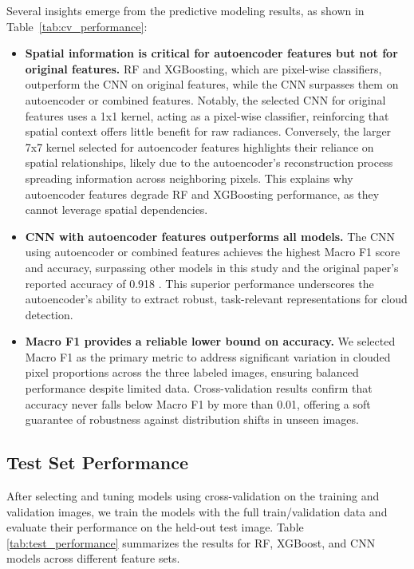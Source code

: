 \documentclass[10pt,letterpaper]{article}
\begin{document}
Several insights emerge from the predictive modeling results, as shown in Table~\ref{tab:cv_performance}:

\begin{itemize}
    \item \textbf{Spatial information is critical for autoencoder features but not for original features.} RF and XGBoosting, which are pixel-wise classifiers, outperform the CNN on original features, while the CNN surpasses them on autoencoder or combined features. Notably, the selected CNN for original features uses a 1x1 kernel, acting as a pixel-wise classifier, reinforcing that spatial context offers little benefit for raw radiances. Conversely, the larger 7x7 kernel selected for autoencoder features highlights their reliance on spatial relationships, likely due to the autoencoder's reconstruction process spreading information across neighboring pixels. This explains why autoencoder features degrade RF and XGBoosting performance, as they cannot leverage spatial dependencies.

    \item \textbf{CNN with autoencoder features outperforms all models.} The CNN using autoencoder or combined features achieves the highest Macro F1 score and accuracy, surpassing other models in this study and the original paper's reported accuracy of 0.918 \cite{shi2008daytime}. This superior performance underscores the autoencoder's ability to extract robust, task-relevant representations for cloud detection.

    \item \textbf{Macro F1 provides a reliable lower bound on accuracy.} We selected Macro F1 as the primary metric to address significant variation in clouded pixel proportions across the three labeled images, ensuring balanced performance despite limited data. Cross-validation results confirm that accuracy never falls below Macro F1 by more than 0.01, offering a soft guarantee of robustness against distribution shifts in unseen images.

\end{itemize}

\subsection{Test Set Performance}

After selecting and tuning models using cross-validation on the training and validation images, we train the models with the full train/validation data and evaluate their performance on the held-out test image. Table \ref{tab:test_performance} summarizes the results for RF, XGBoost, and CNN models across different feature sets.
\end{document}
